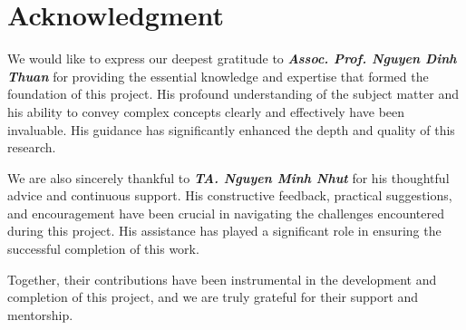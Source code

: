 \documentclass[conference]{IEEEtran}
\begin{document}
\section*{Acknowledgment}
We would like to express our deepest gratitude to \textbf{\textit{Assoc. Prof. Nguyen Dinh Thuan}} for providing the essential knowledge and expertise that formed the foundation of this project. His profound understanding of the subject matter and his ability to convey complex concepts clearly and effectively have been invaluable. His guidance has significantly enhanced the depth and quality of this research.\par
We are also sincerely thankful to \textit{\textbf{TA. Nguyen Minh Nhut}} for his thoughtful advice and continuous support. His constructive feedback, practical suggestions, and encouragement have been crucial in navigating the challenges encountered during this project. His assistance has played a significant role in ensuring the successful completion of this work.\par
Together, their contributions have been instrumental in the development and completion of this project, and we are truly grateful for their support and mentorship.
\end{document}

